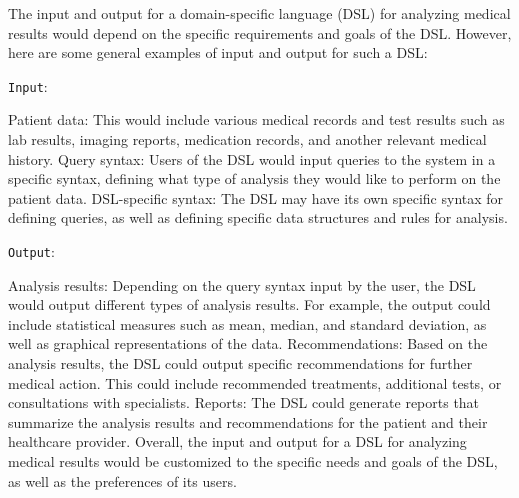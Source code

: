 The input and output for a domain-specific language (DSL) for analyzing medical results would depend on the specific requirements and goals of the DSL. However, here are some general examples of input and output for such a DSL:

\texttt{Input}:

Patient data: This would include various medical records and test results such as lab results, imaging reports, medication records, and another relevant medical history.
Query syntax: Users of the DSL would input queries to the system in a specific syntax, defining what type of analysis they would like to perform on the patient data.
DSL-specific syntax: The DSL may have its own specific syntax for defining queries, as well as defining specific data structures and rules for analysis.

\texttt{Output}:

Analysis results: Depending on the query syntax input by the user, the DSL would output different types of analysis results. For example, the output could include statistical measures such as mean, median, and standard deviation, as well as graphical representations of the data.
Recommendations: Based on the analysis results, the DSL could output specific recommendations for further medical action. This could include recommended treatments, additional tests, or consultations with specialists.
Reports: The DSL could generate reports that summarize the analysis results and recommendations for the patient and their healthcare provider.
Overall, the input and output for a DSL for analyzing medical results would be customized to the specific needs and goals of the DSL, as well as the preferences of its users.